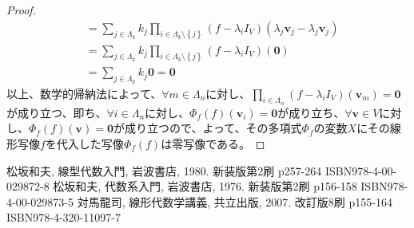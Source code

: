 \documentclass[dvipdfmx]{jsarticle}
\begin{document}
\begin{proof}
\begin{align*}
&= \sum_{j \in \varLambda_{k}} {k_{j}\prod_{i \in \varLambda_{k} \setminus \left\{ j \right\}} \left( f - \lambda_{i}I_{V} \right)\left( \lambda_{j}\mathbf{v}_{j} - \lambda_{j}\mathbf{v}_{j} \right)}\\
&= \sum_{j \in \varLambda_{k}} {k_{j}\prod_{i \in \varLambda_{k} \setminus \left\{ j \right\}} \left( f - \lambda_{i}I_{V} \right)\left( \mathbf{0} \right)}\\
&= \sum_{j \in \varLambda_{k}} {k_{j}\mathbf{0}} = \mathbf{0}
\end{align*}
以上、数学的帰納法によって、$\forall m \in \varLambda_{n}$に対し、$\prod_{i \in \varLambda_{n}} \left( f - \lambda_{i}I_{V} \right)\left( \mathbf{v}_{m} \right) = \mathbf{0}$が成り立つ、即ち、$\forall i \in \varLambda_{n}$に対し、$\varPhi_{f}(f)\left( \mathbf{v}_{i} \right) = \mathbf{0}$が成り立ち、$\forall\mathbf{v} \in V$に対し、$\varPhi_{f}(f)\left( \mathbf{v} \right) = \mathbf{0}$が成り立つので、よって、その多項式$\varPhi_{f}$の変数$X$にその線形写像$f$を代入した写像$\varPhi_{f}(f)$は零写像である。
\end{proof}
\begin{thebibliography}{50}
    松坂和夫, 線型代数入門, 岩波書店, 1980. 新装版第2刷 p257-264 ISBN978-4-00-029872-8
    松坂和夫, 代数系入門, 岩波書店, 1976. 新装版第2刷 p156-158 ISBN978-4-00-029873-5
    対馬龍司, 線形代数学講義, 共立出版, 2007. 改訂版8刷 p155-164 ISBN978-4-320-11097-7
\end{thebibliography}
\end{document}
